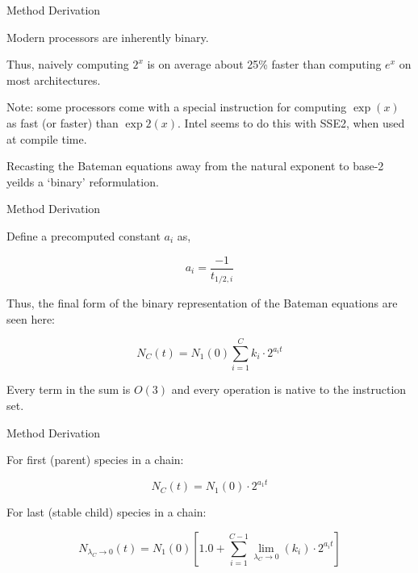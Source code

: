 \documentclass[xcolor=x11names,compress]{beamer}
\begin{document}
\begin{frame}{Method Derivation}

    Modern processors are inherently binary.

    \vspace*{1em}
    Thus, naively computing $2^x$ is on average about 25\% faster than 
    computing $e^x$ on most architectures.

    \vspace*{1em}
    Note: some processors come with a special instruction for computing 
    $\exp(x)$ as fast (or faster) than $\exp2(x)$. Intel seems to do this with 
    SSE2, when used at compile time.

    \vspace*{1em}
    Recasting the Bateman equations away from the natural exponent to base-2
    yeilds a `binary' reformulation.

\end{frame}


\begin{frame}{Method Derivation}

    Define a precomputed constant $a_i$ as,

    \begin{equation}
    \label{a_i}
    a_i = \frac{-1}{t_{1/2,i}}
    \end{equation}

    \vspace*{1em}
    Thus, the final form of the binary representation of the Bateman equations 
    are seen here:

    \begin{equation}
    \label{nc_wakka}
    N_C(t) = N_1(0) \sum_{i=1}^C k_{i} \cdot 2^{a_i t}
    \end{equation}

    \vspace*{1em}
    Every term in the sum is $O(3)$ and every operation is native to the 
    instruction set.

\end{frame}


\begin{frame}{Method Derivation}

    For first (parent) species in a chain:

\begin{equation}
\label{nc_jawakka}
N_C(t) = N_1(0) \cdot 2^{a_1 t}
\end{equation}

    \vspace*{2em}
    For last (stable child) species in a chain:

\begin{equation}
\label{nc_brown_shoes}
N_{\lambda_C \to 0}(t) = N_1(0) \left[1.0 + \sum_{i=1}^{C-1} \lim_{\lambda_C\to 0}(k_{i}) \cdot 2^{a_i t} \right]
\end{equation}

\end{frame}
\end{document}
